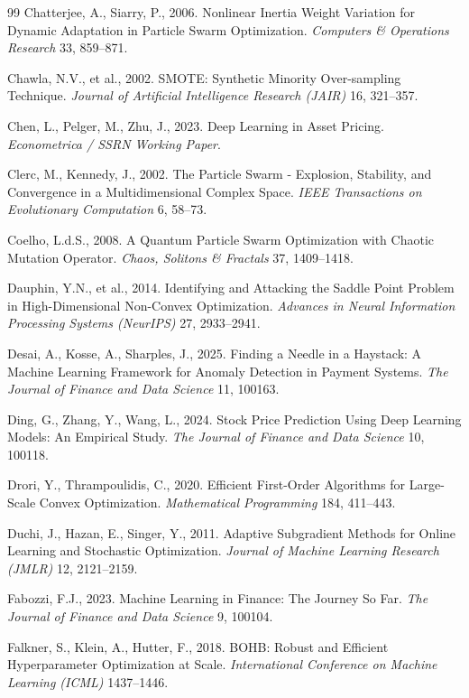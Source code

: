 \begin{thebibliography}{99}
Chatterjee, A., Siarry, P., 2006. Nonlinear Inertia Weight Variation for Dynamic Adaptation in Particle Swarm Optimization. \textit{Computers \& Operations Research} 33, 859–871.

Chawla, N.V., et al., 2002. SMOTE: Synthetic Minority Over-sampling Technique. \textit{Journal of Artificial Intelligence Research (JAIR)} 16, 321–357.

Chen, L., Pelger, M., Zhu, J., 2023. Deep Learning in Asset Pricing. \textit{Econometrica / SSRN Working Paper}.

Clerc, M., Kennedy, J., 2002. The Particle Swarm - Explosion, Stability, and Convergence in a Multidimensional Complex Space. \textit{IEEE Transactions on Evolutionary Computation} 6, 58–73.

Coelho, L.d.S., 2008. A Quantum Particle Swarm Optimization with Chaotic Mutation Operator. \textit{Chaos, Solitons \& Fractals} 37, 1409–1418.

Dauphin, Y.N., et al., 2014. Identifying and Attacking the Saddle Point Problem in High-Dimensional Non-Convex Optimization. \textit{Advances in Neural Information Processing Systems (NeurIPS)} 27, 2933–2941.

Desai, A., Kosse, A., Sharples, J., 2025. Finding a Needle in a Haystack: A Machine Learning Framework for Anomaly Detection in Payment Systems. \textit{The Journal of Finance and Data Science} 11, 100163.

Ding, G., Zhang, Y., Wang, L., 2024. Stock Price Prediction Using Deep Learning Models: An Empirical Study. \textit{The Journal of Finance and Data Science} 10, 100118.

Drori, Y., Thrampoulidis, C., 2020. Efficient First-Order Algorithms for Large-Scale Convex Optimization. \textit{Mathematical Programming} 184, 411–443.

Duchi, J., Hazan, E., Singer, Y., 2011. Adaptive Subgradient Methods for Online Learning and Stochastic Optimization. \textit{Journal of Machine Learning Research (JMLR)} 12, 2121–2159.

Fabozzi, F.J., 2023. Machine Learning in Finance: The Journey So Far. \textit{The Journal of Finance and Data Science} 9, 100104.

Falkner, S., Klein, A., Hutter, F., 2018. BOHB: Robust and Efficient Hyperparameter Optimization at Scale. \textit{International Conference on Machine Learning (ICML)} 1437–1446.


\end{thebibliography}

